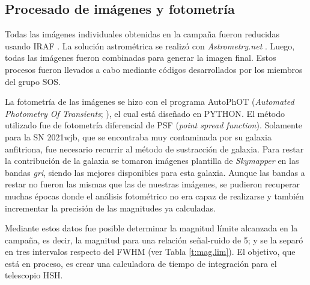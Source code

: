\documentclass[baaa]{baaa}
\begin{document}
\subsection{Procesado de imágenes y fotometría} \label{sec:fotometria}
Todas las imágenes individuales obtenidas en la campaña fueron reducidas usando {\sc IRAF} \citep{IRAF}. La solución astrométrica se realizó con {\em Astrometry.net} \citep{Astrometry}. Luego, todas las imágenes fueron combinadas para generar la imagen final. Estos procesos fueron llevados a cabo mediante códigos desarrollados por los miembros del grupo SOS.

La fotometría de las imágenes se hizo con el programa {\sc AutoPhOT} ({\em Automated Photometry Of Transients}; \citealp[]{Autophot}), el cual está diseñado en {\sc PYTHON}. El método utilizado fue de fotometría diferencial de PSF ({\em point spread function}). Solamente para la SN 2021wjb, que se encontraba muy contaminada por su galaxia anfitriona, fue necesario recurrir al método de sustracción de galaxia. Para restar la contribución de la galaxia se tomaron imágenes plantilla de {\em Skymapper} \citep{Skymapper...36...33O} en las bandas \textit{gri}, siendo las mejores disponibles para esta galaxia. Aunque las bandas a restar no fueron las mismas que las de nuestras imágenes, se pudieron recuperar muchas épocas donde el análisis fotométrico no era capaz de realizarse y también incrementar la precisión de las magnitudes ya calculadas.

Mediante estos datos fue posible determinar la magnitud límite alcanzada en la campaña, es decir, la magnitud para una relación señal-ruido de 5; y se la separó en tres intervalos respecto del FWHM (ver Tabla \ref{t:mag.lim}). El objetivo, que está en proceso, es crear una calculadora de tiempo de integración para el telescopio HSH. 
\end{document}
